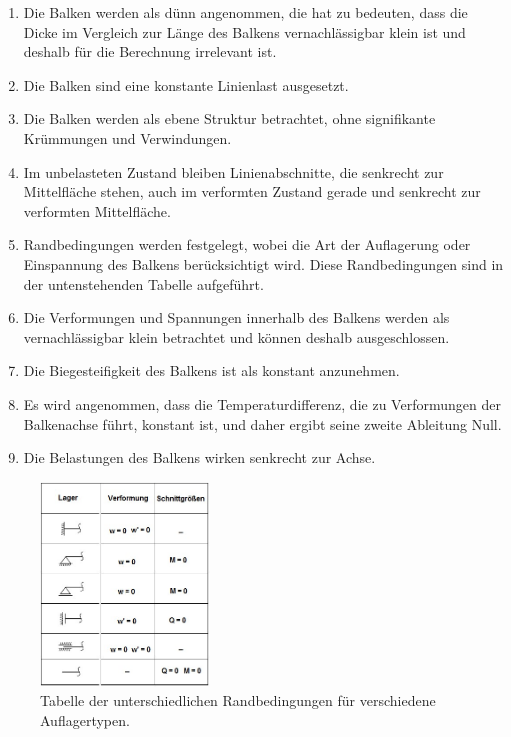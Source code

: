 \begin{enumerate}
	\item Die Balken werden als dünn angenommen, die hat zu bedeuten, dass die Dicke im Vergleich zur Länge des Balkens vernachlässigbar klein ist und deshalb für die Berechnung irrelevant ist.
	
	\item Die Balken sind eine konstante Linienlast ausgesetzt.
	
	\item Die Balken werden als ebene Struktur betrachtet, ohne signifikante Krümmungen und Verwindungen.
	
	\item Im unbelasteten Zustand bleiben Linienabschnitte, die senkrecht zur Mittelfläche stehen, auch im verformten Zustand gerade und senkrecht zur verformten Mittelfläche.
	
	\item Randbedingungen werden festgelegt, wobei die Art der Auflagerung oder Einspannung des Balkens berücksichtigt wird.
	Diese Randbedingungen sind in der untenstehenden Tabelle aufgeführt.
	
	\item Die Verformungen und Spannungen innerhalb des Balkens werden als vernachlässigbar klein betrachtet und können deshalb ausgeschlossen.
	
	\item Die Biegesteifigkeit des Balkens ist als konstant anzunehmen.
	
	\item Es wird angenommen, dass die Temperaturdifferenz, die zu Verformungen der Balkenachse führt, konstant ist, und daher ergibt seine zweite Ableitung Null.
	
	\item Die Belastungen des Balkens wirken senkrecht zur Achse.
\end{enumerate}
\begin{figure}
\begin{center}
	\includegraphics[width=0.4\textwidth]{papers/balken/images/teil2/Randbedingungen.jpg}
\end{center}
\caption{Tabelle der unterschiedlichen Randbedingungen für verschiedene Auflagertypen.}
\end{figure}
